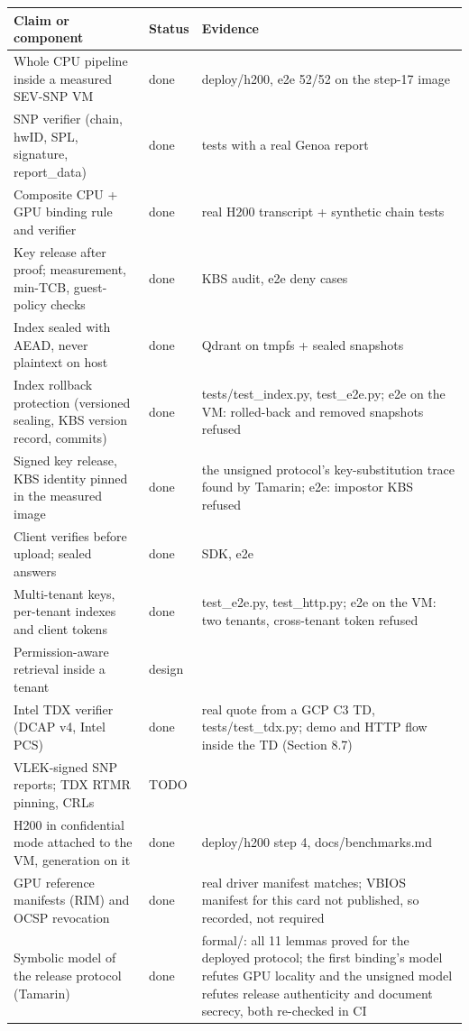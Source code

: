 \documentclass[letterpaper,twocolumn,10pt]{article}
\begin{document}
\begin{table}[t]\centering\small\setlength{\tabcolsep}{4pt}
\begin{tabular}{p{2.6in}p{1.3in}p{2.45in}}\toprule
\textbf{Claim or component} & \textbf{Status} & \textbf{Evidence} \\ \midrule
Whole CPU pipeline inside a measured SEV-SNP VM & done & deploy/h200, e2e 52/52 on the step-17 image \\
SNP verifier (chain, hwID, SPL, signature, report\_data) & done & tests with a real Genoa report \\
Composite CPU + GPU binding rule and verifier & done & real H200 transcript + synthetic chain tests \\
Key release after proof; measurement, min-TCB, guest-policy checks & done & KBS audit, e2e deny cases \\
Index sealed with AEAD, never plaintext on host & done & Qdrant on tmpfs + sealed snapshots \\
Index rollback protection (versioned sealing, KBS version record, commits) & done & tests/test\_index.py, test\_e2e.py; e2e on the VM: rolled-back and removed snapshots refused \\
Signed key release, KBS identity pinned in the measured image & done & the unsigned protocol's key-substitution trace found by Tamarin; e2e: impostor KBS refused \\
Client verifies before upload; sealed answers & done & SDK, e2e \\
Multi-tenant keys, per-tenant indexes and client tokens & done & test\_e2e.py, test\_http.py; e2e on the VM: two tenants, cross-tenant token refused \\
Permission-aware retrieval inside a tenant & design &  \\
Intel TDX verifier (DCAP v4, Intel PCS) & done & real quote from a GCP C3 TD, tests/test\_tdx.py; demo and HTTP flow inside the TD (Section 8.7) \\
VLEK-signed SNP reports; TDX RTMR pinning, CRLs & TODO &  \\
H200 in confidential mode attached to the VM, generation on it & done & deploy/h200 step 4, docs/benchmarks.md \\
GPU reference manifests (RIM) and OCSP revocation & done & real driver manifest matches; VBIOS manifest for this card not published, so recorded, not required \\
Symbolic model of the release protocol (Tamarin) & done & formal/: all 11 lemmas proved for the deployed protocol; the first binding's model refutes GPU locality and the unsigned model refutes release authenticity and document secrecy, both re-checked in CI \\

\end{tabular}
\end{table}
\end{document}
